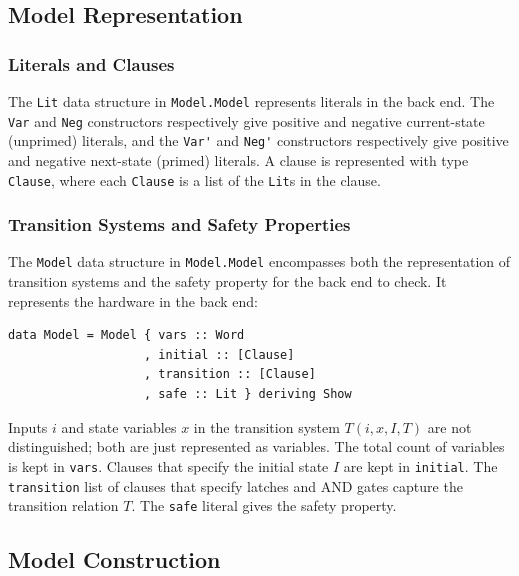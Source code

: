 \documentclass[12pt,a4paper,twoside,openright]{report}
\begin{document}
{{\subsection{Model Representation}
\subsubsection{Literals and Clauses}
The \verb,Lit, data structure in \verb,Model.Model, represents literals in
the back end.
The \verb,Var, and \verb,Neg, constructors respectively give positive and negative
current-state (unprimed) literals, and the \verb,Var', and \verb,Neg', constructors
respectively give positive and negative next-state (primed) literals.
A clause is represented with type \verb,Clause,, where each \verb,Clause, is a
list of the \verb,Lit,s in the clause.

\subsubsection{Transition Systems and Safety Properties}
The \verb,Model, data structure in \verb,Model.Model, encompasses both
the representation of transition systems and the safety property for the back end to check.
It represents the hardware in the back end:
\begin{lstlisting}
data Model = Model { vars :: Word
                   , initial :: [Clause]
                   , transition :: [Clause]
                   , safe :: Lit } deriving Show
\end{lstlisting}

Inputs $i$ and state variables $x$ in the transition system $T(i,x,I,T)$
are not distinguished; both are just represented as variables.
The total count of variables is kept in \verb,vars,.
Clauses that specify the initial state $I$ are kept in \verb,initial,.
The \verb,transition, list of clauses that specify latches and AND
gates capture the transition relation $T$.
The \verb,safe, literal gives the safety property.

\subsection{Model Construction}

}}
\end{document}
